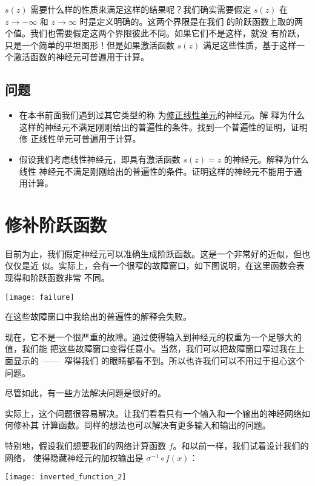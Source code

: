 $s(z)$ 需要什么样的性质来满足这样的结果呢？我们确实需要假定 $s(z)$ 在 $z
\rightarrow -\infty$ 和 $z \rightarrow \infty$ 时是定义明确的。这两个界限是在我们
的阶跃函数上取的两个值。我们也需要假定这两个界限彼此不同。如果它们不是这样，就没
有阶跃，只是一个简单的平坦图形！但是如果激活函数 $s(z)$ 满足这些性质，基于这样一
个激活函数的神经元可普遍用于计算。

\subsection*{问题}

\begin{itemize}
\item 在本书前面我们遇到过其它类型的称
  为\hyperref[subsec:other_models_of_artificial_neuron]{修正线性单元}的神经元。解
  释为什么这样的神经元不满足刚刚给出的普遍性的条件。找到一个普遍性的证明，证明修
  正线性单元可普遍用于计算。
\item 假设我们考虑线性神经元，即具有激活函数 $s(z) = z$ 的神经元。解释为什么线性
  神经元不满足刚刚给出的普遍性的条件。证明这样的神经元不能用于通用计算。
\end{itemize}

\section{修补阶跃函数}
\label{sec:fixing_up_the_step_functions}

目前为止，我们假定神经元可以准确生成阶跃函数。这是一个非常好的近似，但也仅仅是近
似。实际上，会有一个很窄的故障窗口，如下图说明，在这里函数会表现得和阶跃函数非常
不同。
\begin{center}
  \texttt{[image: failure]}
\end{center}

在这些故障窗口中我给出的普遍性的解释会失败。

现在，它不是一个很严重的故障。通过使得输入到神经元的权重为一个足够大的值，我们能
把这些故障窗口变得任意小。当然，我们可以把故障窗口窄过我在上面显示的~——~窄得我们
的眼睛都看不到。所以也许我们可以不用过于担心这个问题。

尽管如此，有一些方法解决问题是很好的。

实际上，这个问题很容易解决。让我们看看只有一个输入和一个输出的神经网络如何修补其
计算函数。同样的想法也可以解决有更多输入和输出的问题。

特别地，假设我们想要我们的网络计算函数 $f$。和以前一样，我们试着设计我们的网络，
使得隐藏神经元的加权输出是 $\sigma^{-1} \circ f(x)$：
\begin{center}
  \texttt{[image: inverted\_function\_2]}
\end{center}

